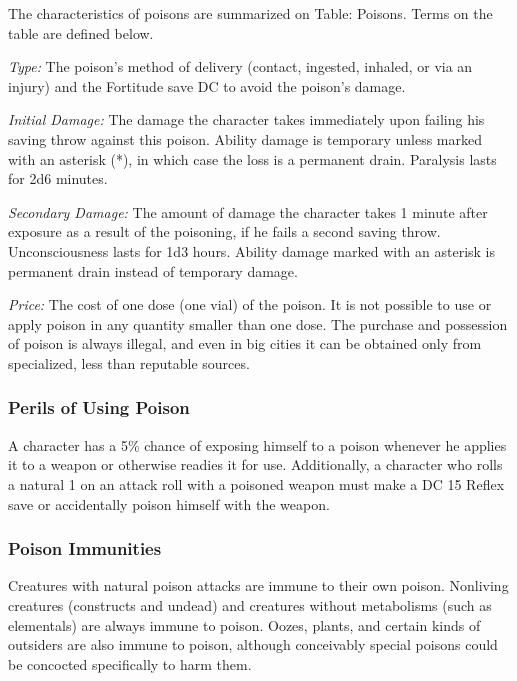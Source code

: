 \documentclass{article}
\begin{document}
The characteristics of poisons are summarized on Table: Poisons. Terms on the table 
are defined below.

\textit{Type: }The poison's method of delivery (contact, ingested, inhaled, or 
via an injury) and the Fortitude save DC to avoid the poison's damage.

\textit{Initial Damage: }The damage the character takes immediately upon failing 
his saving throw against this poison. Ability damage is temporary unless marked 
with an asterisk (*), in which case the loss is a permanent drain. Paralysis lasts 
for 2d6 minutes.

\textit{Secondary Damage: }The amount of damage the character takes 1 minute after 
exposure as a result of the poisoning, if he fails a second saving throw. Unconsciousness 
lasts for 1d3 hours. Ability damage marked with an asterisk is permanent drain 
instead of temporary damage.

\textit{Price: }The cost of one dose (one vial) of the poison. It is not possible 
to use or apply poison in any quantity smaller than one dose. The purchase and 
possession of poison is always illegal, and even in big cities it can be obtained 
only from specialized, less than reputable sources.

\subsubsection*{\textbf{Perils of Using Poison}}

A character has a 5\% chance of exposing himself to a poison whenever he applies 
it to a weapon or otherwise readies it for use. Additionally, a character who rolls 
a natural 1 on an attack roll with a poisoned weapon must make a DC 15 Reflex save 
or accidentally poison himself with the weapon.

\subsubsection*{\textbf{Poison Immunities}}

Creatures with natural poison attacks are immune to their own poison. Nonliving 
creatures (constructs and undead) and creatures without metabolisms (such as elementals) 
are always immune to poison. Oozes, plants, and certain kinds of outsiders are 
also immune to poison, although conceivably special poisons could be concocted 
specifically to harm them.
\end{document}
